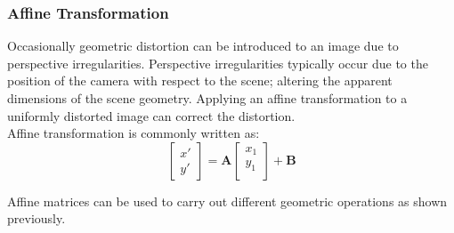 \documentclass{article}
\theoremstyle{definition}
\theoremstyle{remark}
\begin{document}
\subsubsection{Affine Transformation}

Occasionally geometric distortion can be introduced to an image due to perspective irregularities. Perspective irregularities typically occur due to the position of the camera with respect to the scene; altering the apparent dimensions of the scene geometry. Applying an affine transformation to a uniformly distorted image can correct the distortion. \\

\noindent Affine transformation is commonly written as:
\begin{equation}
    \begin{bmatrix}
	x' \\
	y'
    \end{bmatrix} =  
    \pmb{A}
    \begin{bmatrix}
	x_1 \\
	y_1 \\
    \end{bmatrix}
    + 
    \pmb{B}
\end{equation}

\noindent Affine matrices can be used to carry out different geometric operations as shown previously.
\end{document}
